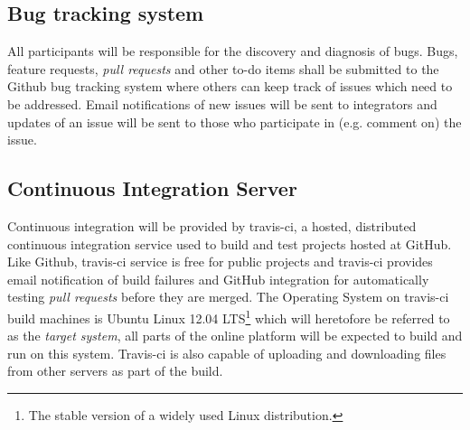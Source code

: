 \subsection{Bug tracking system}
\label{sec:bug tracking-system}

All participants will be responsible for the discovery and diagnosis of bugs. Bugs, feature
requests, \emph{pull requests} and other to-do items shall be submitted to the Github bug tracking
system where others can keep track of issues which need to be addressed. Email notifications of new
issues will be sent to integrators and updates of an issue will be sent to those who participate in
(e.g. comment on) the issue.

\subsection{Continuous Integration Server}
\label{sec:ci-server}

Continuous integration will be provided by travis-ci, a hosted, distributed continuous integration
service used to build and test projects hosted at GitHub. Like Github, travis-ci service is free
for public projects and travis-ci provides email notification of build failures and GitHub
integration for automatically testing \emph{pull requests} before they are merged.
The Operating System on travis-ci build machines is Ubuntu Linux 12.04 LTS\footnote{The stable
version of a widely used Linux distribution.} which will heretofore be referred to as the
\emph{target system}, all parts of the online platform will be expected to build and run on this
system. Travis-ci is also capable of uploading and downloading files from other servers as part of
the build.
